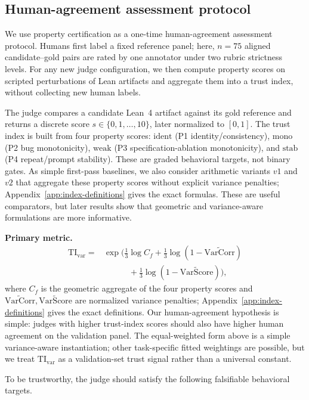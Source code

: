 \documentclass{article}
\begin{document}
\subsection{Human-agreement assessment protocol}
We use property certification as a one-time human-agreement assessment protocol. Humans first label a fixed reference panel; here, \(n=75\) aligned candidate--gold pairs are rated by one annotator under two rubric strictness levels. For any new judge configuration, we then compute property scores on scripted perturbations of Lean artifacts and aggregate them into a trust index, without collecting new human labels.

The judge compares a candidate Lean~4 artifact against its gold reference and returns a discrete score \(s\in\{0,1,\dots,10\}\), later normalized to \([0,1]\). The trust index is built from four property scores:
\(\text{ident}\) (P1 identity/consistency),
\(\text{mono}\) (P2 bug monotonicity),
\(\text{weak}\) (P3 specification-ablation monotonicity), and
\(\text{stab}\) (P4 repeat/prompt stability).
These are graded behavioral targets, not binary gates.
As simple first-pass baselines, we also consider arithmetic variants \(v1\) and \(v2\) that aggregate these property scores without explicit variance penalties; Appendix~\ref{app:index-definitions} gives the exact formulas. These are useful comparators, but later results show that geometric and variance-aware formulations are more informative.

\textbf{Primary metric.}
\[
  \begin{aligned}
    \mathrm{TI}_{\mathrm{var}}
    ={} & \exp\!\Big(
    \tfrac{1}{3}\log C_f
    + \tfrac{1}{3}\log(1-\widetilde{\mathrm{VarCorr}}) \\
        & \qquad\quad
    + \tfrac{1}{3}\log(1-\widetilde{\mathrm{VarScore}})
    \Big),
  \end{aligned}
\]
where \(C_f\) is the geometric aggregate of the four property scores and \(\widetilde{\mathrm{VarCorr}},\widetilde{\mathrm{VarScore}}\) are normalized variance penalties; Appendix~\ref{app:index-definitions} gives the exact definitions. Our human-agreement hypothesis is simple: judges with higher trust-index scores should also have higher human agreement on the validation panel. The equal-weighted form above is a simple variance-aware instantiation; other task-specific fitted weightings are possible, but we treat \(\mathrm{TI}_{\mathrm{var}}\) as a validation-set trust signal rather than a universal constant.

To be trustworthy, the judge should satisfy the following falsifiable behavioral targets.
\end{document}
